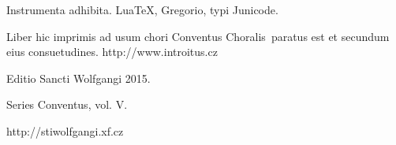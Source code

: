 \documentclass[a4paper, twoside, 12pt]{article}
\newcommand{\annusEditionis}{2015}
\begin{document}
Instrumenta adhibita.
LuaTeX, %
Gregorio, %
typi Junicode. %

\begin{center}
Liber hic imprimis ad usum chori
\guillemotright Conventus Choralis\guillemotleft\
paratus est
et secundum eius consuetudines.
http://www.introitus.cz

\vfill

{\large Editio Sancti Wolfgangi \annusEditionis.}

\vfill

Series \guillemotright Conventus\guillemotleft, vol. V.

\vfill

http://stiwolfgangi.xf.cz

\end{center}

\vfill
\end{document}
